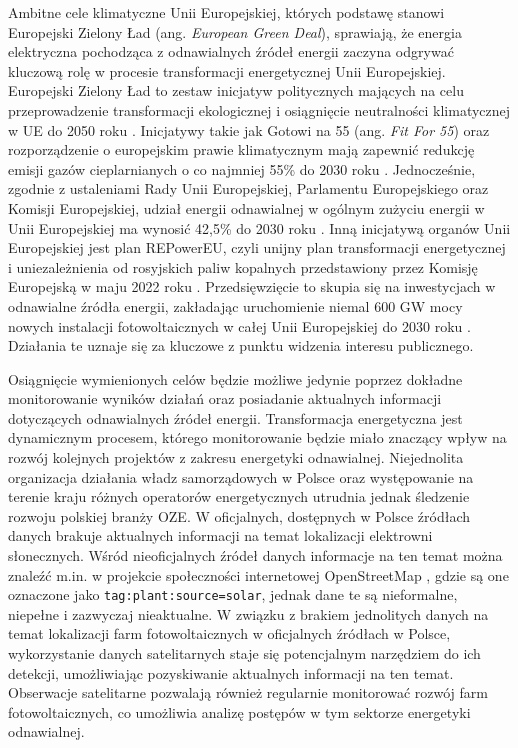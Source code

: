 \documentclass{amuthesis}
\begin{document}
Ambitne cele klimatyczne Unii Europejskiej, których podstawę stanowi
Europejski Zielony Ład (ang. \emph{European Green Deal}), sprawiają, że
energia elektryczna pochodząca z odnawialnych źródeł energii zaczyna
odgrywać kluczową rolę w procesie transformacji energetycznej Unii
Europejskiej. Europejski Zielony Ład to zestaw inicjatyw politycznych
mających na celu przeprowadzenie transformacji ekologicznej i
osiągnięcie neutralności klimatycznej w UE do 2050 roku
\autocite{european_green_deal}. Inicjatywy takie jak Gotowi na 55 (ang.
\emph{Fit For 55}) oraz rozporządzenie o europejskim prawie klimatycznym
mają zapewnić redukcję emisji gazów cieplarnianych o co najmniej 55\% do
2030 roku \autocite{european_green_deal}. Jednocześnie, zgodnie z
ustaleniami Rady Unii Europejskiej, Parlamentu Europejskiego oraz
Komisji Europejskiej, udział energii odnawialnej w ogólnym zużyciu
energii w Unii Europejskiej ma wynosić 42,5\% do 2030 roku
\autocite{renewable_energy_eu}. Inną inicjatywą organów Unii
Europejskiej jest plan REPowerEU, czyli unijny plan transformacji
energetycznej i uniezależnienia od rosyjskich paliw kopalnych
przedstawiony przez Komisję Europejską w maju 2022 roku
\autocite{repowerEU2022}. Przedsięwzięcie to skupia się na inwestycjach
w odnawialne źródła energii, zakładając uruchomienie niemal 600 GW mocy
nowych instalacji fotowoltaicznych w całej Unii Europejskiej do 2030
roku \autocite{repowerEU2022}. Działania te uznaje się za kluczowe z
punktu widzenia interesu publicznego.

Osiągnięcie wymienionych celów będzie możliwe jedynie poprzez dokładne
monitorowanie wyników działań oraz posiadanie aktualnych informacji
dotyczących odnawialnych źródeł energii. Transformacja energetyczna jest
dynamicznym procesem, którego monitorowanie będzie miało znaczący wpływ
na rozwój kolejnych projektów z zakresu energetyki odnawialnej.
Niejednolita organizacja działania władz samorządowych w Polsce oraz
występowanie na terenie kraju różnych operatorów energetycznych utrudnia
jednak śledzenie rozwoju polskiej branży OZE. W oficjalnych, dostępnych
w Polsce źródłach danych brakuje aktualnych informacji na temat
lokalizacji elektrowni słonecznych. Wśród nieoficjalnych źródeł danych
informacje na ten temat można znaleźć m.in. w projekcie społeczności
internetowej OpenStreetMap \autocite{OpenStreetMap}, gdzie są one
oznaczone jako \texttt{tag:plant:source=solar}, jednak dane te są
nieformalne, niepełne i zazwyczaj nieaktualne. W związku z brakiem
jednolitych danych na temat lokalizacji farm fotowoltaicznych w
oficjalnych źródłach w Polsce, wykorzystanie danych satelitarnych staje
się potencjalnym narzędziem do ich detekcji, umożliwiając pozyskiwanie
aktualnych informacji na ten temat. Obserwacje satelitarne pozwalają
również regularnie monitorować rozwój farm fotowoltaicznych, co
umożliwia analizę postępów w tym sektorze energetyki odnawialnej.
\end{document}
